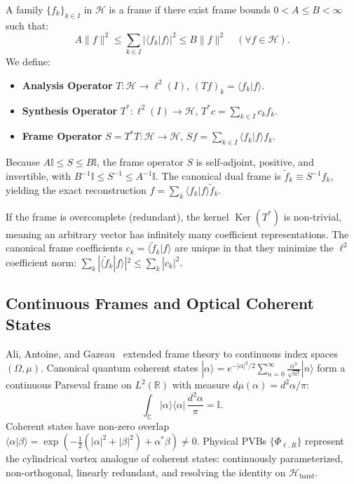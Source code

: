 \documentclass{optica-article}
\begin{document}
A family $\{f_k\}_{k \in I}$ in $\mathcal{H}$ is a frame if there exist frame bounds $0 < A \le B < \infty$ such that:
\begin{equation}
A \|f\|^2 \le \sum_{k \in I} |\langle f_k | f \rangle|^2 \le B \|f\|^2 \quad (\forall f \in \mathcal{H}).
\label{eq:app_discrete_frame}
\end{equation}
We define:
\begin{itemize}
    \item \textbf{Analysis Operator} $T: \mathcal{H} \to \ell^2(I)$, $(T f)_k = \langle f_k | f \rangle$.
    \item \textbf{Synthesis Operator} $T^*: \ell^2(I) \to \mathcal{H}$, $T^* c = \sum_{k \in I} c_k f_k$.
    \item \textbf{Frame Operator} $S = T^* T: \mathcal{H} \to \mathcal{H}$, $S f = \sum_{k \in I} \langle f_k | f \rangle f_k$.
\end{itemize}
Because $A \mathbb{I} \le S \le B \mathbb{I}$, the frame operator $S$ is self-adjoint, positive, and invertible, with $B^{-1} \mathbb{I} \le S^{-1} \le A^{-1} \mathbb{I}$. The canonical dual frame is $\widetilde{f}_k \equiv S^{-1} f_k$, yielding the exact reconstruction $f = \sum_k \langle f_k | f \rangle \widetilde{f}_k$.

If the frame is overcomplete (redundant), the kernel $\operatorname{Ker}(T^*)$ is non-trivial, meaning an arbitrary vector has infinitely many coefficient representations. The canonical frame coefficients $c_k = \langle \widetilde{f}_k | f \rangle$ are unique in that they minimize the $\ell^2$ coefficient norm: $\sum_k |\langle \widetilde{f}_k | f \rangle|^2 \le \sum_k |c_k|^2$.

\subsection{Continuous Frames and Optical Coherent States}

Ali, Antoine, and Gazeau~\cite{Ali1993,Gazeau2009,Klauder1985,Perelomov1986} extended frame theory to continuous index spaces $(\Omega, \mu)$. Canonical quantum coherent states $|\alpha\rangle = e^{-|\alpha|^2/2} \sum_{n=0}^\infty \frac{\alpha^n}{\sqrt{n!}} |n\rangle$ form a continuous Parseval frame on $L^2(\mathbb{R})$ with measure $d\mu(\alpha) = d^2\alpha / \pi$:
\begin{equation}
\int_{\mathbb{C}} |\alpha\rangle \langle \alpha| \, \frac{d^2\alpha}{\pi} = \mathbb{I}.
\label{eq:app_coherent_resolution}
\end{equation}
Coherent states have non-zero overlap $\langle \alpha | \beta \rangle = \exp(-\frac{1}{2}(|\alpha|^2 + |\beta|^2) + \alpha^* \beta) \neq 0$. Physical PVBs $\{\Phi_{\ell, R}\}$ represent the cylindrical vortex analogue of coherent states: continuously parameterized, non-orthogonal, linearly redundant, and resolving the identity on $\mathcal{H}_{\text{band}}$.
\end{document}
